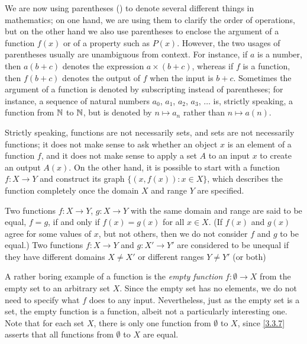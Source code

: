\setcounter{thm}{4}
\begin{rmk}\label{3.3.5}
  We are now using parentheses () to denote several different things in mathematics;
  on one hand, we are using them to clarify the order of operations, but on the other hand we also use parentheses to enclose the argument of a function \(f(x)\) or of a property such as \(P(x)\).
  However, the two usages of parentheses usually are unambiguous from context.
  For instance, if \(a\) is a number, then \(a(b + c)\) denotes the expression \(a \times (b + c)\), whereas if \(f\) is a function, then \(f(b + c)\) denotes the output of \(f\) when the input is \(b + c\).
  Sometimes the argument of a function is denoted by subscripting instead of parentheses;
  for instance, a sequence of natural numbers \(a_0\), \(a_1\), \(a_2\), \(a_3\), \(\dots\) is, strictly speaking, a function from \(\mathbb{N}\) to \(\mathbb{N}\), but is denoted by \(n \mapsto a_n\) rather than \(n \mapsto a(n)\).
\end{rmk}

\begin{rmk}\label{3.3.6}
  Strictly speaking, functions are not necessarily sets, and sets are not necessarily functions;
  it does not make sense to ask whether an object \(x\) is an element of a function \(f\), and it does not make sense to apply a set \(A\) to an input \(x\) to create an output \(A(x)\).
  On the other hand, it is possible to start with a function \(f : X \to Y\) and construct its graph \(\{(x, f(x)) : x \in X\}\), which describes the function completely once the domain \(X\) and range \(Y\) are specified.
\end{rmk}

\begin{defn}\label{3.3.7}
  Two functions \(f : X \to Y\), \(g : X \to Y\) with the same domain and range are said to be equal, \(f = g\), if and only if \(f(x) = g(x)\) for all \(x \in X\).
  (If \(f(x)\) and \(g(x)\) agree for some values of \(x\), but not others, then we do not consider \(f\) and \(g\) to be equal.)
  Two functions \(f : X \to Y\) and \(g : X' \to Y'\) are considered to be unequal if they have different domains \(X \neq X'\) or different ranges \(Y \neq Y'\) (or both)
\end{defn}

\begin{note}
  A rather boring example of a function is the \emph{empty function} \(f : \emptyset \to X\) from the empty set to an arbitrary set \(X\).
  Since the empty set has no elements, we do not need to specify what \(f\) does to any input.
  Nevertheless, just as the empty set is a set, the empty function is a function, albeit not a particularly interesting one.
  Note that for each set \(X\), there is only one function from \(\emptyset\) to \(X\), since \cref{3.3.7} asserts that all functions from \(\emptyset\) to \(X\) are equal.
\end{note}

